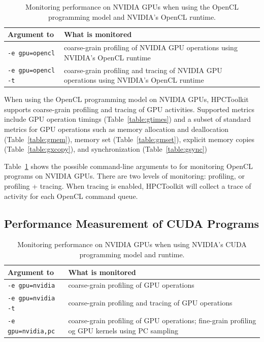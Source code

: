 \begin{table}[t]
\centering
\begin{tabular}{|l|p{3.5in}|}\hline
Argument to \hpcrun{} & What is monitored\\\hline\hline
{\tt -e gpu=opencl} & coarse-grain profiling of NVIDIA GPU operations using NVIDIA's OpenCL runtime\\\hline
{\tt -e gpu=opencl -t} & coarse-grain profiling and tracing of NVIDIA GPU operations using NVIDIA's OpenCL runtime\\\hline
\end{tabular}
\caption{Monitoring performance on NVIDIA GPUs when using the OpenCL programming model and  NVIDIA's OpenCL runtime.}
\label{nvidia-opencl-monitoring-options} 
\end{table}

When using the OpenCL programming model on NVIDIA GPUs, HPCToolkit supports coarse-grain profiling and tracing of GPU activities.
Supported metrics include GPU operation timings (Table~\ref{table:gtimes}) and a subset of standard metrics for GPU operations such as memory allocation and deallocation (Table~\ref{table:gmem}), memory set (Table~\ref{table:gmset}), explicit memory copies (Table~\ref{table:gxcopy}), and synchronization (Table~\ref{table:gsync})

Table~\ref{nvidia-opencl-monitoring-options} shows the possible command-line arguments to \hpcrun{} for monitoring  OpenCL programs on NVIDIA GPUs. There are two levels of monitoring: profiling, or profiling + tracing. When tracing is enabled,  HPCToolkit will collect a trace of activity for each OpenCL command queue. 

\subsection{Performance Measurement of CUDA Programs}

\begin{table}[t]
\centering
\begin{tabular}{|l|p{3.5in}|}\hline
Argument to \hpcrun{} & What is monitored\\\hline\hline
{\tt -e gpu=nvidia} & coarse-grain profiling of GPU operations\\\hline
{\tt -e gpu=nvidia -t} & coarse-grain profiling and tracing of GPU operations\\\hline
{\tt -e gpu=nvidia,pc} &  coarse-grain profiling of GPU operations; fine-grain profiling og GPU kernels using PC sampling\\\hline
\end{tabular}
\caption{Monitoring performance on NVIDIA GPUs when using NVIDIA's CUDA programming model and runtime.}
\label{nvidia-cuda-monitoring-options} 
\end{table}


